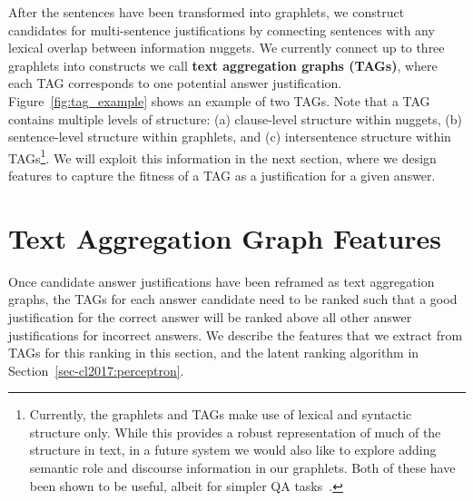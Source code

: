 After the sentences have been transformed into graphlets, we construct candidates for multi-sentence justifications by connecting sentences with any lexical overlap between information nuggets.  We currently connect up to three graphlets into constructs we call \textbf{text aggregation graphs (TAGs)}, where each TAG corresponds to one potential answer justification. 
Figure~\ref{fig:tag_example} shows an example of two TAGs. 
Note that a TAG contains multiple levels of structure: (a) clause-level structure within nuggets, (b) sentence-level structure within graphlets, and (c) intersentence structure within TAGs\footnote{Currently, the graphlets and TAGs make use of lexical and syntactic structure only.  While this provides a robust representation of much of the structure in text, in a future system we would also like to explore adding semantic role and discourse information in our graphlets. Both of these have been shown to be useful, albeit for simpler QA tasks~\cite{Surdeanu:11,jansen14}.}.  
We will exploit this information in the next section, where we design features to capture the fitness of a TAG as a justification for a given answer.



\section{Text Aggregation Graph Features}
\label{sec-cl2017:scoring}

Once candidate answer justifications have been reframed as text aggregation graphs, the TAGs for each answer candidate need to be ranked such that a good justification for the correct answer will be ranked above all other answer justifications for incorrect answers. We describe the features that we extract from TAGs for this ranking in this section, and the latent ranking algorithm in Section~\ref{sec-cl2017:perceptron}.




